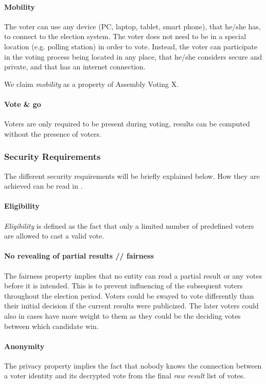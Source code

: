\paragraph{Mobility}
The voter can use any device (PC, laptop, tablet, smart phone), that he/she has, to connect to the election system. The voter does not need to be in a special location (e.g. polling station) in order to vote. Instead, the voter can participate in the voting process being located in any place, that he/she considers secure and private, and that has an internet connection. 

We claim \textit{mobility} as a property of Assembly Voting X.

\paragraph{Vote \& go}
Voters are only required to be present during voting, results can be computed without the presence of voters.


\subsubsection{Security Requirements} \label{sec: security requirements}

The different security requirements will be briefly explained below. How they are achieved can be read in .

\paragraph{Eligibility}
\textit{Eligibility} is defined as the fact that only a limited number of predefined voters are allowed to cast a valid vote. 

\paragraph{No revealing of partial results // fairness}
The fairness property implies that no entity can read a partial result or any votes before it is intended. This is to prevent influencing of the subsequent voters throughout the election period. Voters could be swayed to vote differently than their initial decision if the current results were publicized. The later voters could also in cases have more weight to them as they could be the deciding votes between which candidate win.

\paragraph{Anonymity}
The privacy property implies the fact that nobody knows the connection between a voter identity and its decrypted vote from the final \textit{raw result} list of votes.

